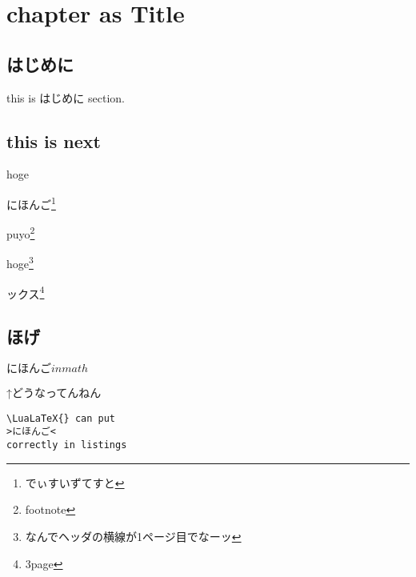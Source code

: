\documentclass{word-lua}
\author{WORD太郎}
\subtitle{subtitleだぴょん}
\begin{document}
\chapter{\Large{}chapter as Title}

\section{はじめに}
this is はじめに section.

\section{this is next}

hoge

にほんご\footnote{でぃすいずてすと}

puyo\footnote{footnote}

hoge\footnote{なんでヘッダの横線が1ページ目でなーッ}

ックス\footnote{3page}

\newpage

\section{ほげ}

\newpage

$にほんごinmath$

\newpage
↑どうなってんねん

\lstset{language=TeX,numbers=left}
\begin{lstlisting}
\LuaLaTeX{} can put
>にほんご<
correctly in listings
\end{lstlisting}
\end{document}
